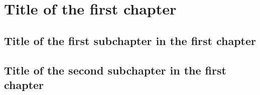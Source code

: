 \chapter{Title of the first chapter}

\section{Title of the first subchapter in the first chapter}

\section{Title of the second subchapter in the first chapter}

